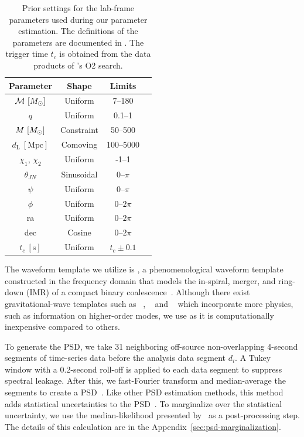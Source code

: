 \documentclass[useAMS,fleqn, usenatbib, final]{mnras}
\begin{document}
\begin{table}
    \centering
    \caption{
    Prior settings for the lab-frame parameters used during our parameter estimation. The definitions of the parameters are documented in \citet[Table~E1]{bilby_gwtc}. The trigger time $t_c$ is obtained from the data products of \pycbc's O2 search.  \label{tab:priors}} 
    \begin{tabular}{c c c c}
    \hline
    Parameter & Shape & Limits \\
    \hline
          $\mathcal{M}\ [\msun]$           & Uniform & 7--180  \\
          $q$                           & Uniform & 0.1--1  \\
          $M\ [\msun]$                     & Constraint & 50--500  \\
          $d_\mathrm{L}\ [\mathrm{Mpc}]$   & Comoving & 100--5000  \\
          $\chi_1$, $\chi_2$            & Uniform & -1--1  \\
          $\theta_{JN}$                 & Sinusoidal & 0--$\pi$  \\
          $\psi$                        & Uniform & 0--$\pi$  \\
          $\phi$                        & Uniform & 0--$2\pi$  \\
          ra                            & Uniform & 0--$2\pi$  \\
          dec                           & Cosine & 0--$2\pi$  \\
          $t_c\ [\mathrm{s}]$              & Uniform & $t_c\pm0.1$  \\
    \hline
    \end{tabular}
\end{table}


The waveform template we utilize is \imrphenomp, a phenomenological waveform template constructed in the frequency domain that models the in-spiral, merger, and ring-down (IMR) of a compact binary coalescence~\citep{khan2016frequency}. Although there exist gravitational-wave templates such as \imrxhm~\citep{imrphenompxhm}, \nrsur~\citep{nrsur7dq4} and \seob~\citep{seobnrv4phm} which incorporate more physics, such as information on higher-order modes, we use \imrphenomp as it is computationally inexpensive compared to others. 



To generate the PSD, we take 31 neighboring off-source non-overlapping  4-second  segments of time-series data before the analysis data segment $d_i$. A Tukey window with a 0.2-second roll-off is applied to each data segment to suppress spectral leakage. After this, we fast-Fourier transform and median-average the segments to create a PSD~\citep{ligo_psd}. Like other PSD estimation methods, this method adds statistical uncertainties to the PSD~\citep{psd_student_t, chatziioannou2019noise, Biscoveanu:2020:PhRvD}. To marginalize over the statistical uncertainty, we use the median-likelihood presented by~\citet{psd_student_t} as a post-processing step.  The details of this calculation are in the Appendix~\ref{sec:psd-marginalization}.
\end{document}
